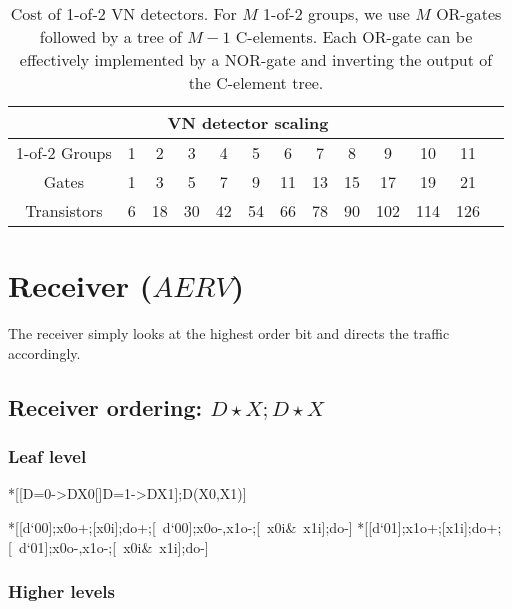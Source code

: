 \documentclass{article}
\begin{document}
\begin{table}
  \centering
  \begin{tabular}{|c|c|c|c|c|c|c|c|c|c|c|c|c|}
    \hline
    \multicolumn{12}{|c|}{VN detector scaling} \\
    \hline
    1-of-2 Groups & 1 & 2 & 3 & 4 & 5 & 6 & 7 & 8 & 9 & 10 & 11 \\
    \hline
    Gates & 1 & 3 & 5 & 7 & 9 & 11 & 13 & 15 & 17 & 19 & 21 \\
    \hline
    Transistors & 6 & 18 & 30 & 42 & 54 & 66 & 78 & 90 & 102 & 114 & 126 \\
    \hline
  \end{tabular}
  \caption{\label{tab:vn_cost} Cost of 1-of-2 VN detectors. For $M$ 1-of-2 groups, we use $M$ OR-gates followed by a tree of $M-1$ C-elements. Each OR-gate can be effectively implemented by a NOR-gate and inverting the output of the C-element tree.}
\end{table}

\section{Receiver ($AERV$)}

The receiver simply looks at the highest order bit and directs the traffic accordingly.

\subsection{Receiver ordering: $D\!\star\!X;D\!\star\!X$}

\subsubsection{Leaf level}

\begin{csp}
*[[D=0->D\star\!X0[]D=1->D\star\!X1];D\star\!(X0,X1)]
\end{csp}

\begin{hse}
*[[d`{00}];x0o+;[x0i];do+;[~d`{00}];x0o-,x1o-;[~x0i&~x1i];do-]
*[[d`{01}];x1o+;[x1i];do+;[~d`{01}];x0o-,x1o-;[~x0i&~x1i];do-]
\end{hse}

\subsubsection{Higher levels}
\end{document}
